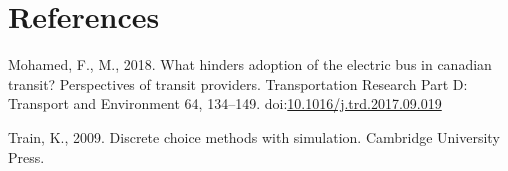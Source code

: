 \documentclass[]{elsarticle} %
\begin{document}
\section*{References}\label{references}

\hypertarget{refs}{}
\hypertarget{ref-Mohamed2018}{}
Mohamed, F., M., 2018. What hinders adoption of the electric bus in
canadian transit? Perspectives of transit providers. Transportation
Research Part D: Transport and Environment 64, 134--149.
doi:\href{https://doi.org/10.1016/j.trd.2017.09.019}{10.1016/j.trd.2017.09.019}

\hypertarget{ref-Train2009}{}
Train, K., 2009. Discrete choice methods with simulation. Cambridge
University Press.
\end{document}
